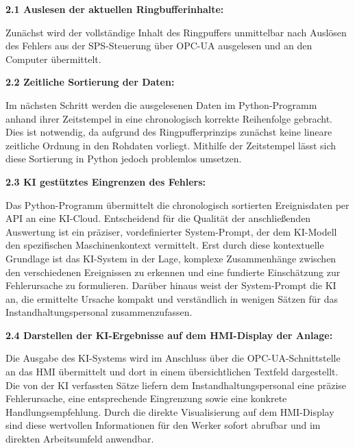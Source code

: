         \textbf{2.1 Auslesen der aktuellen Ringbufferinhalte:}

        Zunächst wird der vollständige Inhalt des Ringpuffers unmittelbar nach Auslösen des Fehlers aus der SPS-Steuerung über OPC-UA ausgelesen und an den Computer übermittelt.


        \textbf{2.2 Zeitliche Sortierung der Daten:}

        Im nächsten Schritt werden die ausgelesenen Daten im Python-Programm anhand ihrer Zeitstempel in eine chronologisch korrekte Reihenfolge gebracht. Dies ist notwendig, da aufgrund des Ringpufferprinzips zunächst keine lineare zeitliche Ordnung in den Rohdaten vorliegt. Mithilfe der Zeitstempel lässt sich diese Sortierung in Python jedoch problemlos umsetzen.

        \textbf{2.3 KI gestütztes Eingrenzen des Fehlers:}

        Das Python-Programm übermittelt die chronologisch sortierten Ereignisdaten per API an eine KI-Cloud. Entscheidend für die Qualität der anschließenden Auswertung ist ein präziser, vordefinierter System-Prompt, der dem KI-Modell den spezifischen Maschinenkontext vermittelt. Erst durch diese kontextuelle Grundlage ist das KI-System in der Lage, komplexe Zusammenhänge zwischen den verschiedenen Ereignissen zu erkennen und eine fundierte Einschätzung zur Fehlerursache zu formulieren. Darüber hinaus weist der System-Prompt die KI an, die ermittelte Ursache kompakt und verständlich in wenigen Sätzen für das Instandhaltungspersonal zusammenzufassen.

        \textbf{2.4 Darstellen der KI-Ergebnisse auf dem HMI-Display der Anlage:}

        Die Ausgabe des KI-Systems wird im Anschluss über die OPC-UA-Schnittstelle an das HMI übermittelt und dort in einem übersichtlichen Textfeld dargestellt. Die von der KI verfassten Sätze liefern dem Instandhaltungspersonal eine präzise Fehlerursache, eine entsprechende Eingrenzung sowie eine konkrete Handlungsempfehlung. Durch die direkte Visualisierung auf dem HMI-Display sind diese wertvollen Informationen für den Werker sofort abrufbar und im direkten Arbeitsumfeld anwendbar.